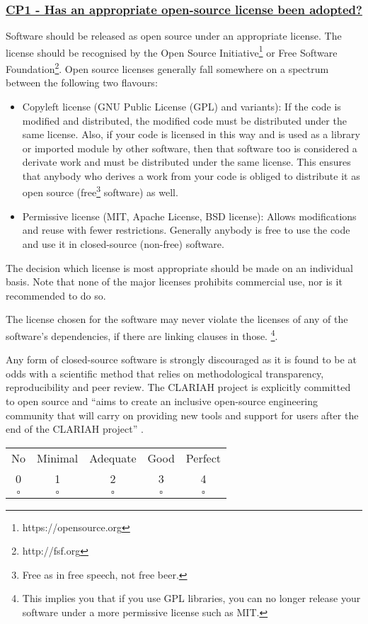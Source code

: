 \documentclass[a4paper,11pt]{article}
\newcommand{\criterion}[2]{\subsubsection*{\underline{#1 - #2}}\label{id:#1}}
\newcommand\CheckTable{%
  \begin{tabular}{ccccc}
    No & Minimal & Adequate & Good & Perfect \\
    0 & 1 & 2 & 3 & 4 \\
    \hline
    $\square$ & $\square$ & $\square$ & $\square$ & $\square$ \\
  \end{tabular}%
}
\begin{document}
\newcommand{\cpOneID}{CP1}
\newcommand{\cpOneText}{Has an appropriate open-source license been adopted?}
\criterion{\cpOneID}{\cpOneText}

Software should be released as open source under an appropriate license. The
license should be recognised by the Open Source Initiative\footnote{https://opensource.org} or Free Software
Foundation\footnote{http://fsf.org}. Open source licenses generally fall somewhere on a spectrum between the following two flavours:

\begin{itemize}
 \item Copyleft license (GNU Public License (GPL) and variants): If the code is modified and distributed, the modified code must be distributed under the same license. Also, if your code is licensed in this way and is used as a library or imported module by other software, then that software too is considered a derivate work and must be distributed under the same license. This ensures that anybody who derives a work from your code is obliged to distribute it as open source (free\footnote{Free as in free speech, not free beer.} software) as well.
 \item Permissive license (MIT, Apache License, BSD license): Allows modifications and reuse with fewer restrictions. Generally anybody is free to use the code and use it in closed-source (non-free) software.
\end{itemize}

The decision which license is most appropriate should be made on an individual
basis. Note that none of the major licenses prohibits commercial use, nor is it
recommended to do so.

The license chosen for the software may never violate the licenses of any of
the software's dependencies, if there are linking clauses in those. \footnote{This implies you that if you use GPL libraries, you can no longer release your software under a more permissive license such as MIT.}.

Any form of closed-source software is strongly discouraged as it is found to be
at odds with a scientific method that relies on methodological transparency,
reproducibility and peer review. The CLARIAH project is explicitly committed to
open source and ``aims to create an inclusive open-source engineering community
that will carry on providing new tools and support for users after the end of
the CLARIAH project'' \citep{CLARIAHTECHPLAN1}.

\CheckTable
\end{document}
